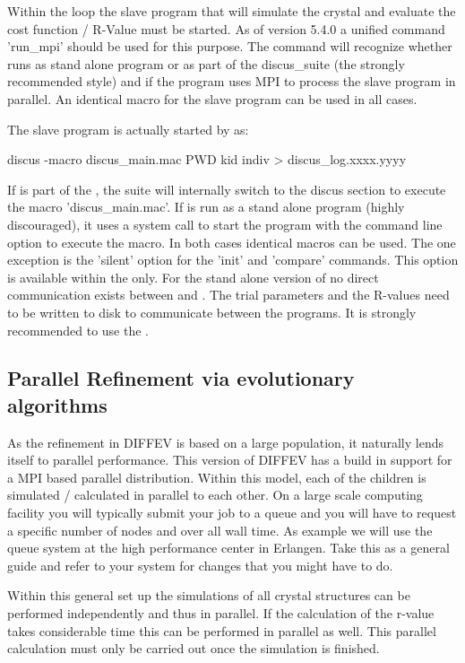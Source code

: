Within the loop the slave program that will simulate the crystal and evaluate
the cost function / R-Value must be started. As of version 5.4.0 a unified
command 'run\_mpi' should be used for this purpose. The command will 
recognize whether \Diffev runs as stand alone program or as part of the
discus\_suite (the strongly recommended style) and if the program uses MPI to 
process the slave program in parallel. An identical macro for the slave 
program can be used in all cases. 

The slave program is actually started 
by \Diffev as:
\begin{MacVerbatim}
discus -macro discus_main.mac PWD kid indiv > discus_log.xxxx.yyyy
\end{MacVerbatim}

If \Diffev is part of the \suite, the suite will internally switch to
the discus section to execute the macro 'discus\_main.mac'. If \Diffev is
run as a stand alone program (highly discouraged), it uses a system 
call to start the \Discus 
program with the command line option to execute the macro. In both cases
identical \Discus macros can be used. The one exception is the 'silent'
option for the 'init' and 'compare' commands. This option is available
within the \Suite only. For the stand alone version of \Diffev no direct
communication exists between \Diffev and \discus. The trial parameters and
the R-values need to be written to disk to communicate between the 
programs. It is strongly recommended to use the \suite.

\subsection{Parallel Refinement via evolutionary algorithms \label{diff-parallel}}

As the refinement in DIFFEV is based on a large population, it 
naturally lends itself to parallel performance. This version of DIFFEV has a 
build in support for a MPI based parallel distribution. Within this model,
each of the children is simulated / calculated in parallel to each other. 
On a large scale computing facility you will typically submit your job to 
a queue and you will have to request a specific number of nodes and over all
wall time. As example we will use the queue system at the high performance
center in Erlangen. Take this as a general guide and refer to your system
for changes that you might have to do.


Within this general set up the simulations of all crystal structures can be 
performed independently and thus in parallel. If the calculation of the 
r-value takes considerable time this can be performed in parallel as well. 
This parallel calculation must only be carried out once the simulation
is finished.

